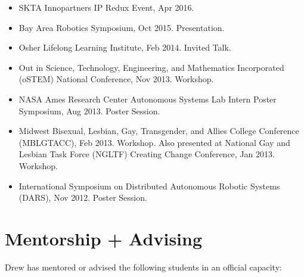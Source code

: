 \documentclass[letterpaper]{deedy-resume} %
\begin{document}
\vspace{0.2cm}
\begin{itemize}

\item {} SKTA Innopartners IP Redux Event, Apr 2016.

\item {} Bay Area Robotics Symposium, Oct 2015. Presentation.
  
\item {} Osher Lifelong Learning Institute, Feb 2014. Invited Talk.

\item {} Out in Science, Technology, Engineering, and Mathematics Incorporated (oSTEM) National Conference, Nov 2013. Workshop.

\item {} NASA Ames Research Center Autonomous Systems Lab Intern Poster Symposium, Aug 2013. Poster Session.

\item {} Midwest Bisexual, Lesbian, Gay, Transgender, and Allies College Conference (MBLGTACC), Feb 2013. Workshop. Also presented at National Gay and Lesbian Task Force (NGLTF) Creating Change Conference, Jan 2013. Workshop.

\item {} International Symposium on Distributed Autonomous Robotic Systems (DARS), Nov 2012. Poster Session.

\end{itemize}

  

\section{Mentorship + Advising}

\vspace{0.2cm}

Drew has mentored or advised the following students in an official capacity:
\end{document}
